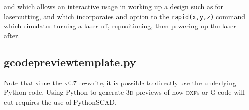 \documentclass{ltxdoc}
\begin{document}
\noindent and which allows an interactive usage in working up a design such as for lasercutting, and which incorporates and option to the \verb|rapid(x,y,z)| command which simulates turning a laser off, repositioning, then powering up the laser after.


\subsection{gcodepreviewtemplate.py}
           
Note that since the v0.7 re-write, it is possible to directly use the underlying Python code. Using Python to generate \textsc{3d} previews of how \textsc{dxf}s or G-code will cut requires the use of PythonSCAD.

\end{document}
